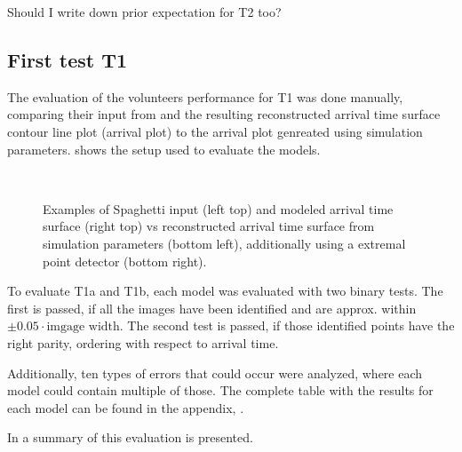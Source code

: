 \todo{!} Should I write down prior expectation for T2 too?




\subsection{First test T1} \label{sec:tests.t1}

The evaluation of the volunteers performance for T1 was done manually, comparing their input from \spl and the resulting reconstructed arrival time surface contour line plot (arrival plot) to the arrival plot genreated using simulation parameters.
 shows the setup used to evaluate the models.

\begin{figure}
  \centering
   \\
  \caption{Examples of Spaghetti input (left top) and modeled arrival time surface (right top) vs reconstructed arrival time surface from simulation parameters (bottom left), additionally using a extremal point detector (bottom right).}
  \label{fig:output_compare}
\end{figure}

To evaluate T1a and T1b, each model was evaluated with two binary tests.
The first is passed, if all the images have been identified and are approx. within $\pm0.05\cdot\text{imgage width}$.
The second test is passed, if those identified points have the right parity, ordering with respect to arrival time.

Additionally, ten types of errors that could occur were analyzed, where each model could contain multiple of those.
The complete table with the results for each model can be found in the appendix, .

In  a summary of this evaluation is presented.

